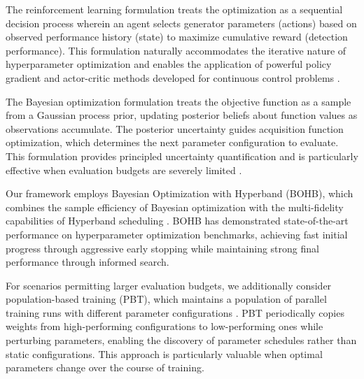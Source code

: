 The reinforcement learning formulation treats the optimization as a sequential decision process wherein an agent selects generator parameters (actions) based on observed performance history (state) to maximize cumulative reward (detection performance). This formulation naturally accommodates the iterative nature of hyperparameter optimization and enables the application of powerful policy gradient and actor-critic methods developed for continuous control problems \cite{schulman2017ppo, haarnoja2018sac}.

The Bayesian optimization formulation treats the objective function as a sample from a Gaussian process prior, updating posterior beliefs about function values as observations accumulate. The posterior uncertainty guides acquisition function optimization, which determines the next parameter configuration to evaluate. This formulation provides principled uncertainty quantification and is particularly effective when evaluation budgets are severely limited \cite{snoek2012practical}.

Our framework employs Bayesian Optimization with Hyperband (BOHB), which combines the sample efficiency of Bayesian optimization with the multi-fidelity capabilities of Hyperband scheduling \cite{falkner2018bohb}. BOHB has demonstrated state-of-the-art performance on hyperparameter optimization benchmarks, achieving fast initial progress through aggressive early stopping while maintaining strong final performance through informed search.

For scenarios permitting larger evaluation budgets, we additionally consider population-based training (PBT), which maintains a population of parallel training runs with different parameter configurations \cite{jaderberg2017population}. PBT periodically copies weights from high-performing configurations to low-performing ones while perturbing parameters, enabling the discovery of parameter schedules rather than static configurations. This approach is particularly valuable when optimal parameters change over the course of training.

